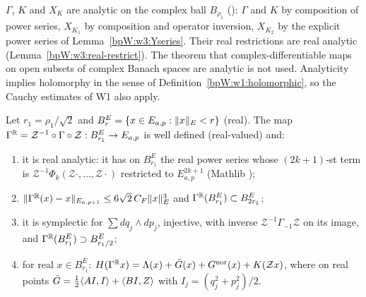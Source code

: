 \begin{remark}\label{bpW:w3:class-remark}
$\Gamma$, $K$ and $X_K$ are analytic on the complex ball $B_{\rho_1}$ (): $\Gamma$ and $K$
by composition of power series, $X_{K_1}$ by composition and operator inversion, $X_{K_2}$ by the explicit power
series of Lemma~\ref{bpW:w3:Yseries}. Their real restrictions are real analytic (Lemma~\ref{bpW:w3:real-restrict}).
The theorem that complex-differentiable maps on open subsets of complex Banach spaces are analytic is not used.
Analyticity implies holomorphy in the sense of Definition~\ref{bpW:w1:holomorphic}, so the Cauchy estimates of W1 also
apply.
\end{remark}

\begin{corollary}\label{bpW:w3:gamma-real}
Let $r_1=\rho_1/\sqrt2$ and $B^E_r=\{x\in E_{a,p}:\lVert x\rVert_E<r\}$ (real). The map
$\Gamma^{\mathbb{R}}=\mathcal Z^{-1}\circ\Gamma\circ\mathcal Z:B^E_{r_1}\to E_{a,p}$ is well defined (real-valued) and:
\begin{enumerate}[label=(\roman*)]
\item it is real analytic: it has on $B^E_{r_1}$ the real power series whose $(2k+1)$-st term is
  $\mathcal Z^{-1}\Phi_k(\mathcal Z\cdot,\dots,\mathcal Z\cdot)$ restricted to $E_{a,p}^{2k+1}$ (Mathlib
  );
\item $\lVert \Gamma^{\mathbb{R}}(x)-x\rVert_{E_{a,p+1}}\le6\sqrt2\,C_F\lVert x\rVert_E^3$ and
  $\Gamma^{\mathbb{R}}(B^E_{r_1})\subset B^E_{2r_1}$;
\item it is symplectic for $\sum dq_j\wedge dp_j$, injective, with inverse $\mathcal Z^{-1}\Gamma_{-1}\mathcal Z$
  on its image, and $\Gamma^{\mathbb{R}}(B^E_{r_1})\supset B^E_{r_1/2}$;
\item for real $x\in B^E_{r_1}$: $H(\Gamma^{\mathbb{R}} x)=\Lambda(x)+\bar G(x)+G^{\rm nor}(x)+K(\mathcal Zx)$, where on
  real points $\bar G=\frac12\langle AI,I\rangle+\langle BI,Z\rangle$ with $I_j=(q_j^2+p_j^2)/2$.
\end{enumerate}
\end{corollary}

